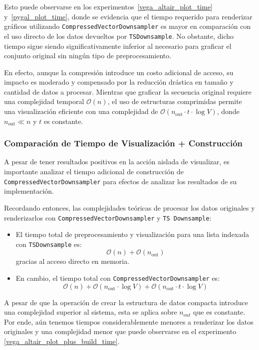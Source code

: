 Esto puede observarse en los experimentos~\ref{vega_altair_plot_time} y~\ref{pygal_plot_time}, donde se evidencia que el tiempo requerido para renderizar gráficos utilizando \texttt{CompressedVectorDownsampler} es mayor en comparación con el uso directo de los datos devueltos por \texttt{TSDownsample}. No obstante, dicho tiempo sigue siendo significativamente inferior al necesario para graficar el conjunto original sin ningún tipo de preprocesamiento.

En efecto, aunque la compresión introduce un costo adicional de acceso, su impacto es moderado y compensado por la reducción drástica en tamaño y cantidad de datos a procesar. Mientras que graficar la secuencia original requiere una complejidad temporal \(\mathcal{O}(n)\), el uso de estructuras comprimidas permite una visualización eficiente con una complejidad de \(\mathcal{O}(n_{\text{out}} \cdot t \cdot \log V)\), donde \(n_{\text{out}} \ll n\) y \(t\) es constante. 

\subsubsection{Comparación de Tiempo de Visualización + Construcción}

A pesar de tener resultados positivos en la acción aislada de visualizar, es importante analizar el tiempo adicional de construcción de \texttt{CompressedVectorDownsampler} para efectos de analizar los resultados de su implementación.

Recordando entonces, las complejidades teóricas de procesar los datos originales y renderizarlos con \texttt{CompressedVectorDownsampler} y \texttt{TS Downsample}:

\begin{itemize}
    \item El tiempo total de preprocesamiento y visualización para una lista indexada con \texttt{TSDownsample} es:
    \[
    \mathcal{O}(n) + \mathcal{O}(n_{\text{out}})
    \]
    gracias al acceso directo en memoria.

    \item En cambio, el tiempo total con \texttt{CompressedVectorDownsampler} es:
    \[
    \mathcal{O}(n) + \mathcal{O}(n_{\text{out}} \cdot \log V) + \mathcal{O}(n_{\text{out}} \cdot t \cdot \log V)
    \]

\end{itemize}

A pesar de que la operación de crear la estructura de datos compacta introduce una complejidad superior al sistema, esta se aplica sobre $n_{out}$ que es constante. Por ende, aún tenemos tiempos considerablemente menores a renderizar los datos originales y una complejidad menor que puede observarse en el experimento \ref{vega_altair_plot_plus_build_time}.

